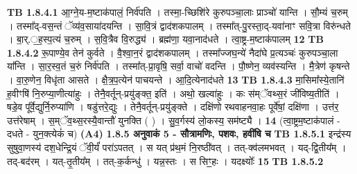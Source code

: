\documentclass[17pt]{extarticle}
\begin{document}
                                \textbf{ TB 1.8.4.1} \newline
                  आ॒ग्ने॒य-म॒ष्टाक॑पालं॒ निर्व॑पति । तस्मा॒-च्छिशि॑रे कुरुपञ्चा॒लाः प्राञ्चो॑ यान्ति । सौ॒म्यं च॒रुम् । तस्मा᳚द्-वस॒न्तं ॅव्य॑व॒साया॑दयन्ति । सा॒वि॒त्रं द्वाद॑शकपालम् । तस्मा᳚त्-पु॒रस्ता॒द्-यवा॑नाꣳ सवि॒त्रा विरु॑न्धते । बा॒र्.॒ह॒स्प॒त्यं च॒रुम् । स॒वि॒त्रैव वि॒रुद्ध्य॑ । ब्रह्म॑णा॒ यवा॒नाद॑धते । त्वा॒ष्ट्र-म॒ष्टाक॑पालम् \textbf{ 12} \newline
                  \newline
                                \textbf{ TB 1.8.4.2} \newline
                  रू॒पाण्ये॒व तेन॑ कुर्वते । वै॒श्वा॒न॒रं द्वाद॑शकपालम् । तस्मा᳚ज्जघ॒न्ये॑ नैदा॑घे प्र॒त्यञ्चः॑ कुरुपञ्चा॒ला या᳚न्ति । सा॒र॒स्व॒तं च॒रुं निर्व॑पति । तस्मा᳚त्-प्रा॒वृषि॒ सर्वा॒ वाचो॑ वदन्ति । पौ॒ष्णेन॒ व्यव॑स्यन्ति । मै॒त्रेण॑ कृषन्ते । वा॒रु॒णेन॒ विधृ॑ता आसते । क्षै॒त्र॒प॒त्येन॑ पाचयन्ते । आ॒दि॒त्येनाद॑धते \textbf{ 13} \newline
                  \newline
                                \textbf{ TB 1.8.4.3} \newline
                  मा॒सिमा᳚स्ये॒तानि॑ ह॒वीꣳषि॑ नि॒रुप्या॒णीत्या॑हुः । तेनै॒वर्तून्-प्रयु॑ङ्क्त॒ इति॑ । अथो॒ खल्वा॑हुः । कः स॑म्ॅवथ्स॒रं जी॑विष्य॒तीति॑ । षडे॒व पू᳚र्वे॒द्युर्नि॒रुप्या॑णि । षडु॑त्तरे॒द्युः । तेनै॒वर्तून्-प्रयु॑ङ्क्ते । दक्षि॑णो रथवाहनवा॒हः पूर्वे॑षां॒ दक्षि॑णा । उत्त॑र॒ उत्त॑रेषाम् । स॒म्ॅव॒थ्स॒रस्यै॒वान्तौ॑ युनक्ति ( ) । सु॒व॒र्गस्य॑ लो॒कस्य॒ सम॑ष्ट्यै । \textbf{ 14} \newline
                  \newline
                                    (त्वा॒ष्ट्रम॒ष्टाक॑पालं - दधते - युन॒क्त्येकं॑ च) \textbf{(A4)} \newline \newline
                \textbf{ 1.8.5     अनुवाकं   5 - सौत्रामणिः, पशवः, हवींषि च} \newline
                                \textbf{ TB 1.8.5.1} \newline
                  इन्द्र॑स्य सुषुवा॒णस्य॑ दश॒धेन्द्रि॒यं ॅवी॒र्यं॑ परा॑ऽपतत् । स यत् प्र॑थ॒मं नि॒रष्ठी॑वत् । तत्-क्व॑लमभवत् । यद्-द्वि॒तीय᳚म् । तद्-बद॑रम् । यत्-तृ॒तीय᳚म् । तत्-क॒र्कन्धु॑ । यन्न॒स्तः । स सिꣳ॒॒हः । यदक्ष्योः᳚ \textbf{ 15} \newline
                  \newline
                                \textbf{ TB 1.8.5.2} \newline
\end{document}
